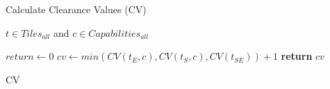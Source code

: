 \begin{algorithm}
\caption{Calculate Clearance Values (CV)}
\label{aha-alg:calculateclearance}
\begin{algorithmic}
\REQUIRE $t \in Tiles_{all}$ and $c \in Capabilities_{all}$

	 \STATE $return \leftarrow 0$  \ENDIF
	\STATE $cv \leftarrow min(CV(t_{E}, c), CV(t_{S}, c), CV(t_{SE})) + 1$
	\STATE \textbf{return} $cv$


\caption{CV}
\label{alg_ccv}
\end{algorithmic}
\end{algorithm}
